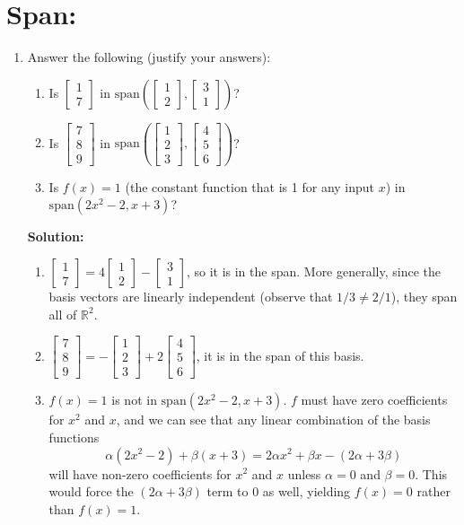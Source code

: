 \documentclass[]{article}
\newcommand{\R}{\mathbb{R}}
\newcommand{\bbm}{\begin{bmatrix}}
\newcommand{\ebm}{\end{bmatrix}}
\newcommand{\vspan}{\mathrm{span}}
\newcommand{\solution}{\vskip 0.5cm \textbf{\large Solution:} \\}
\begin{document}
    \section*{Span:}
    \begin{enumerate}[resume]
	\item Answer the following (justify your answers):
	  \begin{enumerate}
	  \item Is $\bbm 1\\7\ebm$ in $\vspan \left(\bbm 1\\2 \ebm,\bbm 3\\1 \ebm \right)$?
	  \item Is $\bbm 7\\8\\9\ebm$ in $\vspan\left(\bbm 1\\2\\3 \ebm,\bbm 4\\5\\6 \ebm \right)$?
	  \item Is $f(x)=1$ (the constant function that is 1 for any input $x$) in $\vspan(2x^2-2, x+3)$?
	  \end{enumerate}
      
	  \solution
	  \begin{enumerate}
	  \item
        $\bbm 1\\7\ebm = 4 \bbm 1\\2 \ebm - \bbm 3\\1 \ebm$, so it is in
        the span. More generally, since the basis vectors are linearly
        independent (observe that $1/3 \neq 2/1$), they span all of $\R^2$.
        
	  \item $\bbm 7\\8\\9\ebm = -\bbm 1\\2\\3 \ebm + 2 \bbm 4\\5\\6
        \ebm$, it is in the span of this basis.

	  \item $f(x) = 1$ is not in $\vspan(2x^2-2, x+3)$. $f$ must have
        zero coefficients for $x^2$ and $x$, and we can see that any
        linear combination of the basis functions
        \[
        \alpha(2x^2 - 2) + \beta(x + 3) = 2 \alpha x^2 + \beta x - (2\alpha + 3\beta)
        \]
        will have non-zero coefficients for $x^2$ and $x$ unless
        $\alpha = 0$ and $\beta = 0$. This would force the $(2\alpha +
        3\beta)$ term to 0 as well, yielding $f(x) = 0$ rather than
        $f(x) = 1$.
	  \end{enumerate}
    \end{enumerate}
\end{document}
